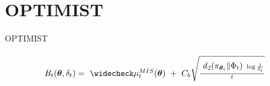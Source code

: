\section{OPTIMIST}

\begin{frame}{OPTIMIST}



\onslide<+->
\begin{equation*}
	B_t(\vtheta,\delta_t)
	= 
	\tikz[baseline]{\node[anchor=base] (t2) {$\wc{\mu}^{MIS}_t(\vtheta)$};}
	+
	\tikz[baseline]{\node[anchor=base] (t3) {$C_b\sqrt{\frac{
	\tikz[baseline]{\node[anchor=base] (t4) {$d_{2}(\pi_{\vtheta_t}\|\Phi_{t})$};}\log\frac{1}{\delta_t}}{t}}$};}
\end{equation*}



\end{frame}
